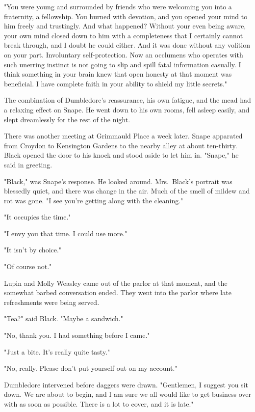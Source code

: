 "You were young and surrounded by friends who were welcoming you into a fraternity, a fellowship. You burned with devotion, and you opened your mind to him freely and trustingly. And what happened? Without your even being aware, your own mind closed down to him with a completeness that I certainly cannot break through, and I doubt he could either. And it was done without any volition on your part. Involuntary self-protection. Now an occlumens who operates with such unerring instinct is not going to slip and spill fatal information casually. I think something in your brain knew that open honesty at that moment was beneficial. I have complete faith in your ability to shield my little secrets."

The combination of Dumbledore's reassurance, his own fatigue, and the mead had a relaxing effect on Snape. He went down to his own rooms, fell asleep easily, and slept dreamlessly for the rest of the night.

There was another meeting at Grimmauld Place a week later. Snape apparated from Croydon to Kensington Gardens to the nearby alley at about ten-thirty. Black opened the door to his knock and stood aside to let him in. "Snape," he said in greeting.

"Black," was Snape's response. He looked around. Mrs.~Black's portrait was blessedly quiet, and there was change in the air. Much of the smell of mildew and rot was gone. "I see you're getting along with the cleaning."

"It occupies the time."

"I envy you that time. I could use more."

"It isn't by choice."

"Of course not."

Lupin and Molly Weasley came out of the parlor at that moment, and the somewhat barbed conversation ended. They went into the parlor where late refreshments were being served.

"Tea?" said Black. "Maybe a sandwich."

"No, thank you. I had something before I came."

"Just a bite. It's really quite tasty."

"No, really. Please don't put yourself out on my account."

Dumbledore intervened before daggers were drawn. "Gentlemen, I suggest you sit down. We are about to begin, and I am sure we all would like to get business over with as soon as possible. There is a lot to cover, and it is late."

